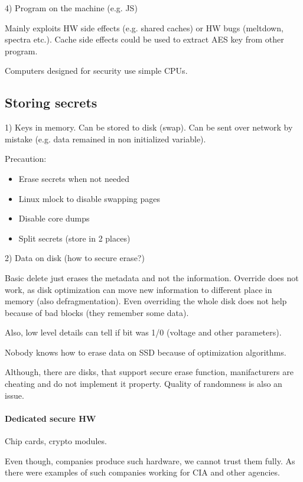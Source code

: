 4) Program on the machine (e.g. JS)

Mainly exploits HW side effects (e.g. shared caches) or HW bugs (meltdown, spectra etc.).
Cache side effects could be used to extract AES key from other program.

\begin{note}
	Computers designed for security use simple CPUs.
\end{note}

\subsection{Storing secrets}
1) Keys in memory. Can be stored to disk (swap). Can be sent over network by mistake (e.g. data remained in non initialized variable).

Precaution:
\begin{itemize}
	\item Erase secrets when not needed
	\item Linux mlock to disable swapping pages
	\item Disable core dumps
	\item Split secrets (store in 2 places)
\end{itemize}

2) Data on disk (how to secure erase?)

Basic delete just erases the metadata and not the information.
Override does not work, as disk optimization can move new information to different place in memory (also defragmentation). Even overriding the whole disk does not help because of bad blocks (they remember some data).

Also, low level details can tell if bit was 1/0 (voltage and other parameters).

\begin{note}
	Nobody knows how to erase data on SSD because of optimization algorithms.
\end{note}

Although, there are disks, that support secure erase function, manifacturers are cheating and do not implement it property. Quality of randomness is also an issue.

\paragraph{Dedicated secure HW}
Chip cards, crypto modules.

Even though, companies produce such hardware, we cannot trust them fully. As there were examples of such companies working for CIA and other agencies.

